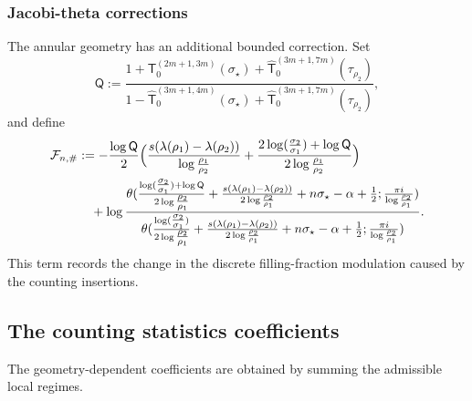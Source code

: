 \documentclass[a4paper]{article}
\numberwithin{equation}{section}
\begin{document}
\subsubsection{Jacobi-theta corrections}
The annular geometry has an additional bounded correction.  Set
\begin{equation}
\label{def of mathsf Q}
\mathsf{Q}
:=
\frac{1+\mathsf{T}_{0}^{(2m+1,3m)}(\sigma_{\star})
+\widehat{\mathsf{T}}_0^{(3m+1,7m)}(\tau_{\rho_2})}{1-\widehat{\mathsf{T}}_0^{(3m+1,4m)}(\sigma_{\star})+\widehat{\mathsf{T}}_0^{(3m+1,7m)}(\tau_{\rho_2})},
\end{equation}
and define
\begin{align}
    \begin{split}
    \label{def of calFNsharp}
\mathcal{F}_{n,\#}
&:=
-\frac{\log \mathsf{Q}}{2}\Bigl(\frac{s(\lambda(\rho_1)-\lambda(\rho_2))}{\log \frac{\rho_1}{\rho_2}}+\frac{2\log (\tfrac{\sigma_2}{\sigma_1})+\log \mathsf{Q}}{2\log \frac{\rho_1}{\rho_2}}\Bigr)
    \\
    &\quad 
    +\log \frac{\theta( \tfrac{\log (\tfrac{\sigma_2}{\sigma_1})+\log \mathsf{Q}}{2\log \tfrac{\rho_2}{\rho_1}}+\frac{s(\lambda(\rho_1)-\lambda(\rho_2))}{2\log\frac{\rho_2}{\rho_1}}+n\sigma_{\star}-\alpha +\frac{1}{2}; \frac{\pi i }{\log \frac{\rho_2}{\rho_1}})}{\theta( \tfrac{\log (\tfrac{\sigma_2}{\sigma_1})}{2\log \tfrac{\rho_2}{\rho_1}}+\frac{s(\lambda(\rho_1)-\lambda(\rho_2))}{2\log\frac{\rho_2}{\rho_1}}+n\sigma_{\star}-\alpha+\frac{1}{2}; \frac{\pi i }{\log \frac{\rho_2}{\rho_1}})}.
\end{split}   
\end{align}
This term records the change in the discrete filling-fraction modulation caused
by the counting insertions.
\subsection{The counting statistics coefficients}
The geometry-dependent coefficients are obtained by summing the admissible
local regimes.
\end{document}
